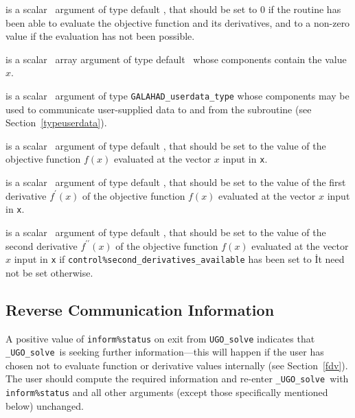 \documentclass{galahad}
\newcommand{\packagename}{UGO}
\newcommand{\fullpackagename}{\libraryname\_\packagename}
\newcommand{\solver}{{\tt \fullpackagename\_solve}}
\begin{document}
\begin{description}
 is a scalar \intentout\ argument of type default \integer,
that should be set to 0 if the routine has been able to evaluate
the objective function and its derivatives,
and to a non-zero value if the evaluation has not been possible.

 is a scalar \intentin\ array argument of type default \realdp\
whose components contain the value $x$.

 is a scalar \intentinout\ argument of type
{\tt GALAHAD\_userdata\_type} whose components may be used
to communicate user-supplied data to and from the
subroutine (see Section~\ref{typeuserdata}).

 is a scalar \intentout\ argument of type default \realdp,
that should be set to the value of the objective function $f(x)$
evaluated at the vector $x$ input in {\tt x}.

 is a scalar \intentout\ argument of type default \realdp,
that should be set to the value of the first derivative
$f^{\prime}(x)$ of the objective function $f(x)$
evaluated at the vector $x$ input in {\tt x}.

 is a scalar \intentout\ argument of type default \realdp,
that should be set to the value of the second derivative
$f^{\prime\prime}(x)$ of the objective function $f(x)$
evaluated at the vector $x$ input in {\tt x} if
{\tt control\%second\_derivatives\_available} has been set to \true\.
It need not be set otherwise.

\end{description}


\subsection{\label{reverse}Reverse Communication Information}

A positive value of {\tt inform\%status} on exit from
{\tt \packagename\_solve}
indicates that
\solver\ is seeking further information---this will happen
if the user has chosen not to evaluate function or
derivative values internally (see Section~\ref{fdv}).
The user should compute the required information and re-enter \solver\
with {\tt inform\%status} and all other arguments (except those specifically
mentioned below) unchanged.
\end{document}
